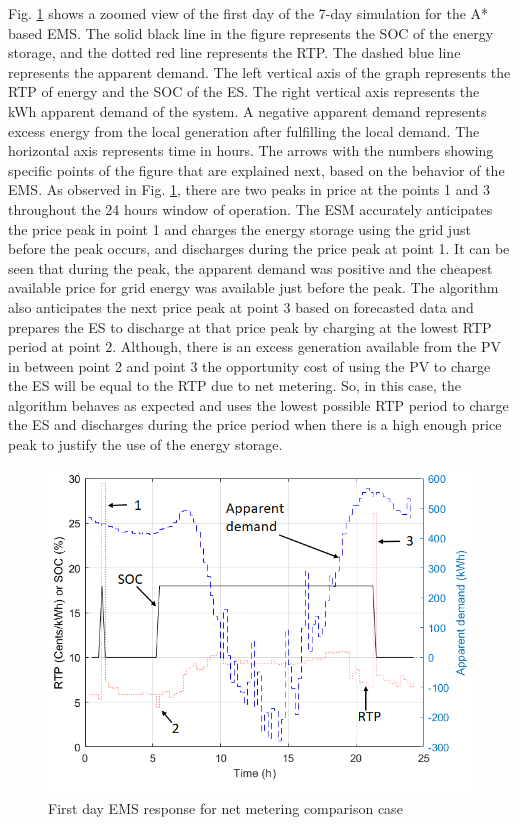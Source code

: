 Fig. \ref{fig:SBMPO_COMP_1_day} shows a zoomed view of the first day of the 7-day simulation for the A* based EMS. The solid black line in the figure represents the SOC of the energy storage, and the dotted red line represents the RTP. The dashed blue line represents the apparent demand. The left vertical axis of the graph represents the RTP of energy and the SOC of the ES. The right vertical axis represents the kWh apparent demand of the system. A negative apparent demand represents excess energy from the local generation after fulfilling the local demand. The horizontal axis represents time in hours. The arrows with the numbers showing specific points of the figure that are explained next, based on the behavior of the EMS. As observed in Fig. \ref{fig:SBMPO_COMP_1_day}, there are two peaks in price at the points 1 and 3 throughout the 24 hours window of operation. The ESM accurately anticipates the price peak in point 1 and charges the energy storage using the grid just before the peak occurs, and discharges during the price peak at point 1. It can be seen that during the peak, the apparent demand was positive and the cheapest available price for grid energy was available just before the peak. The algorithm also anticipates the next price peak at point 3 based on forecasted data and prepares the ES to discharge at that price peak by charging at the lowest RTP period at point 2. Although, there is an excess generation available from the PV in between point 2 and point 3 the opportunity cost of using the PV to charge the ES will be equal to the RTP due to net metering. So, in this case, the algorithm behaves as expected and uses the lowest possible RTP period to charge the ES and discharges during the price period when there is a high enough price peak to justify the use of the energy storage.

\begin{figure}[!ht]
    \centering
    \includegraphics[width = \linewidth]{figs/SBMPO_COMP_1_day.png}
    \caption{First day EMS response for net metering comparison case}
    \label{fig:SBMPO_COMP_1_day}
\end{figure}

